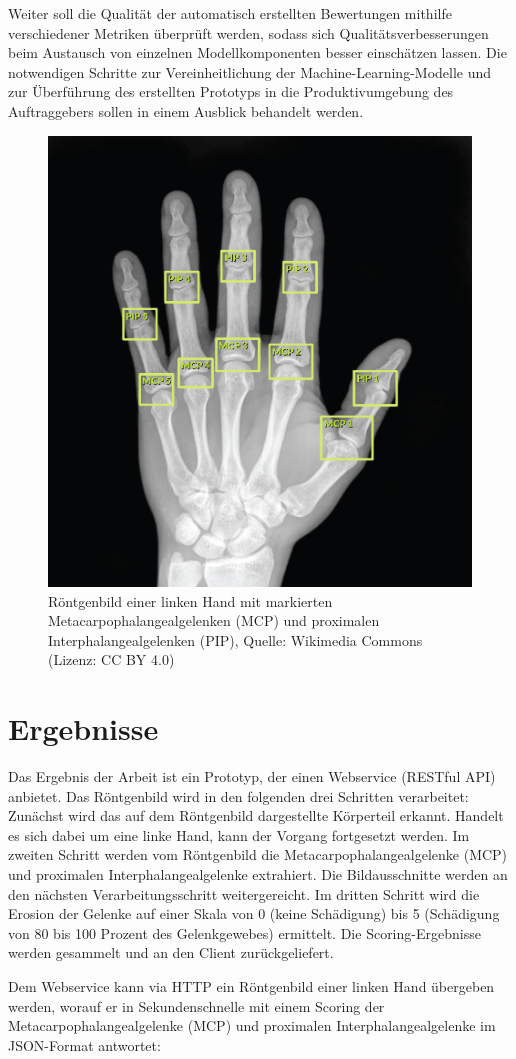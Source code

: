 \documentclass[a4paper,10pt,hidelinks]{scrartcl}
\begin{document}
Weiter soll die Qualität der automatisch erstellten Bewertungen mithilfe verschiedener Metriken überprüft werden, sodass sich Qualitätsverbesserungen beim Austausch von einzelnen Modellkomponenten besser einschätzen lassen. Die notwendigen Schritte zur Vereinheitlichung der Machine-Learning-Modelle und zur Überführung des erstellten Prototyps in die Produktivumgebung des Auftraggebers sollen in einem Ausblick behandelt werden.

\begin{figure}
    \centering
    \includegraphics[width=0.4\linewidth]{pics/xray-left-hand-annotated.png}
    \caption{Röntgenbild einer linken Hand mit markierten Metacarpophalangealgelenken (MCP) und proximalen Interphalangealgelenken (PIP), Quelle: Wikimedia Commons (Lizenz: CC BY 4.0)}
    \label{fig:xray-left-hand-annotated}
\end{figure}

\section{\fontsize{14}{16}\selectfont Ergebnisse}

Das Ergebnis der Arbeit ist ein Prototyp, der einen Webservice (RESTful API) anbietet. Das Röntgenbild wird in den folgenden drei Schritten verarbeitet: Zunächst wird das auf dem Röntgenbild dargestellte Körperteil erkannt. Handelt es sich dabei um eine linke Hand, kann der Vorgang fortgesetzt werden. Im zweiten Schritt werden vom Röntgenbild die Metacarpophalangealgelenke (MCP) und proximalen Interphalangealgelenke extrahiert. Die Bildausschnitte werden an den nächsten Verarbeitungsschritt weitergereicht. Im dritten Schritt wird die Erosion der Gelenke auf einer Skala von 0 (keine Schädigung) bis 5 (Schädigung von 80 bis 100 Prozent des Gelenkgewebes) ermittelt. Die Scoring-Ergebnisse werden gesammelt und an den Client zurückgeliefert.

Dem Webservice kann via HTTP ein Röntgenbild einer linken Hand übergeben werden, worauf er in Sekundenschnelle mit einem Scoring der Metacarpophalangealgelenke (MCP) und proximalen Interphalangealgelenke im JSON-Format antwortet:
\end{document}
